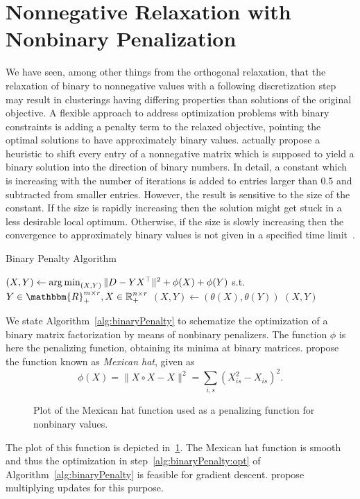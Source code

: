 \section{Nonnegative Relaxation with Nonbinary Penalization}\label{sec:ZS:Penalty}
We have seen, among other things from the orthogonal relaxation, that the relaxation of binary to nonnegative values with a following discretization step may result in clusterings having differing properties than solutions of the original objective. A flexible approach to address optimization problems with binary constraints is adding a penalty term to the relaxed objective, pointing the optimal solutions to have approximately binary values.
\cite{lazzeroni2002plaid} actually propose a heuristic to shift every entry of a nonnegative matrix which is supposed to yield a binary solution into the direction of binary numbers. In detail, a constant which is increasing with the number of iterations is added to entries larger than $0.5$ and subtracted from smaller entries. However, the result is sensitive to the size of the constant. If the size is rapidly increasing then the solution might get stuck in a less desirable local optimum. Otherwise, if the size is slowly increasing then the convergence to approximately binary values is not given in a specified time limit~\citep{turner2005improved}.
\begin{algorithm}[t]
\caption{Binary Penalty Algorithm} 
\begin{algorithmic}[1]
   
  \State $(X,Y)\gets \operatorname*{arg\,min}_{(X,Y)}\|D-YX^\top\|^2 + \phi(X) + \phi(Y)$ s.t. $Y\in\mathbbm{R}_+^{m\times r}, X\in\mathbb{R}_+^{n\times r}$ \label{alg:binaryPenalty:opt}
  \State $(X,Y)\gets (\theta(X),\theta(Y))$
  \State \Return $(X,Y)$
  \EndFunction
\end{algorithmic}
\label{alg:binaryPenalty}
\end{algorithm}

We state Algorithm~\ref{alg:binaryPenalty} to schematize the optimization of a binary matrix factorization by means of nonbinary penalizers. The function $\phi$ is here the penalizing function, obtaining its minima at binary matrices. \citep{zhang2010binary,zhang2013overlapping} propose the function known as \emph{Mexican hat}, given as
\[\phi(X) = \|X\circ X-X\|^2 = \sum_{i,s} (X_{is}^2-X_{is})^2.\]
\begin{figure}
    \centering
    
    \caption{Plot of the Mexican hat function used as a penalizing function for nonbinary values.}
    \label{fig:mexicanHat}
\end{figure}
The plot of this function is depicted in~\ref{fig:mexicanHat}. The Mexican hat function is smooth and thus the optimization in step~\ref{alg:binaryPenalty:opt} of Algorithm~\ref{alg:binaryPenalty} is feasible for gradient descent. \citep{zhang2010binary,zhang2013overlapping} propose multiplying updates for this purpose.